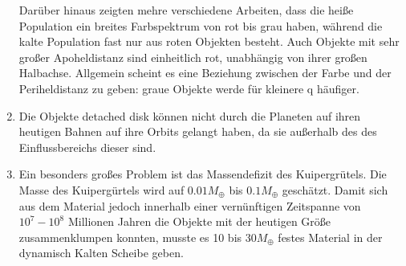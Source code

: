 \documentclass[10pt,a4paper,twoside]{article}
\begin{document}
\begin{enumerate}
Darüber hinaus zeigten mehre verschiedene Arbeiten, dass die heiße Population ein breites Farbspektrum von rot bis grau haben, während die kalte Population fast nur aus roten Objekten besteht. %
Auch Objekte mit sehr großer Apoheldistanz sind einheitlich rot, unabhängig von ihrer großen Halbachse.
Allgemein scheint es eine Beziehung zwischen der Farbe und der Periheldistanz zu geben: graue Objekte werde für kleinere q häufiger.
\item Die Objekte detached disk können nicht durch die Planeten auf ihren heutigen Bahnen auf ihre Orbits gelangt haben, da sie außerhalb des des Einflussbereichs dieser sind.
\item Ein besonders großes Problem ist das Massendefizit des Kuipergrütels. Die Masse des Kuipergürtels wird auf $0.01 M_\oplus$ bis $0.1 M_\oplus$ geschätzt. %
Damit sich aus dem Material jedoch innerhalb einer vernünftigen Zeitspanne von $10^7-10^8$ Millionen Jahren die Objekte mit der heutigen Größe zusammenklumpen konnten, musste es 10 bis $30 M_\oplus$ festes Material in der dynamisch Kalten Scheibe geben. %
\end{enumerate} %
\end{document}
